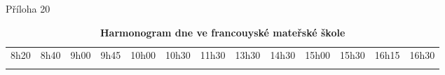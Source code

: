 \begin{landscape}
\begin{table}
\center
Příloha 20\\
	\shorthandoff{-}
	\begin{tabular}{
	|p{10mm}
	|p{10mm}
	|p{23mm}
	|p{8mm}
	|p{15mm}
	|p{27mm}
	|p{18mm} %
	|p{30mm}
	|p{15mm}
	|p{15mm}
	|p{23mm}
	|p{7mm}
	|p{0mm}}
		\multicolumn{1}{l}{\hspace{-5mm}8h20} & 
		\multicolumn{1}{l}{\hspace{-5mm}8h40} &  	%
		\multicolumn{1}{l}{\hspace{-5mm}9h00} &  	%
		\multicolumn{1}{l}{\hspace{-5mm}9h45} & 	%
		\multicolumn{1}{l}{\hspace{-8mm}10h00} & 	%
		\multicolumn{1}{l}{\hspace{-8mm}10h30} &  	%
		\multicolumn{1}{l}{\hspace{-8mm}11h30} &  	%
		\multicolumn{1}{l}{\hspace{-8mm}13h30} &  	%
		\multicolumn{1}{l}{\hspace{-8mm}14h30} &  	%
		\multicolumn{1}{l}{\hspace{-8mm}15h00} & 	%
		\multicolumn{1}{l}{\hspace{-8mm}15h30} &  	%
		\multicolumn{1}{l}{\hspace{-8mm}16h15} &  	%
		\multicolumn{1}{l}{\hspace{-8mm}16h30}  \\ 	%
		\cline{1-6}\cline{8-12}
		 & & & & \cellcolor{gray!50} & & & & &  \cellcolor{gray!50}& & &
		 \multicolumn{1}{l}{} \\ [15mm]
		 \cline{1-6}\cline{8-12}
	\end{tabular}
	\hfill
	\caption{\textbf{Harmonogram dne ve francouyské mateřské škole}}
	\label{tabulkaMS}
\end{table}


\end{landscape}
